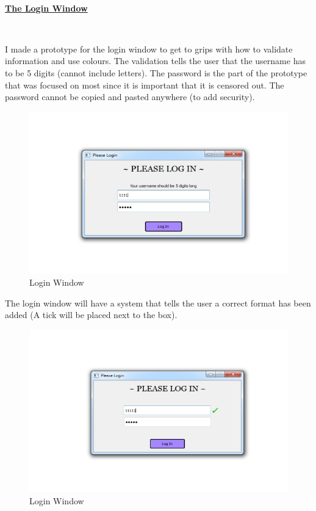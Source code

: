\

\underline {\textbf{The Login Window}}

\

I made a prototype for the login window to get to grips with how to validate information and use colours. The validation tells the user that the username has to be 5 digits (cannot include letters). The password is the part of the prototype that was focused on most since it is important that it is censored out. The password cannot be copied and pasted anywhere (to add security).

\begin{figure}[H]
\includegraphics[width=\textwidth]{LoginWindow.jpg}
\caption{Login Window}
\end{figure}

\newpage

The login window will have a system that tells the user a correct format has been added (A tick will be placed next to the box).
\begin{figure}[H]
\includegraphics[width=\textwidth]{LoginWindow2.jpg}
\caption{Login Window}
\end{figure}

